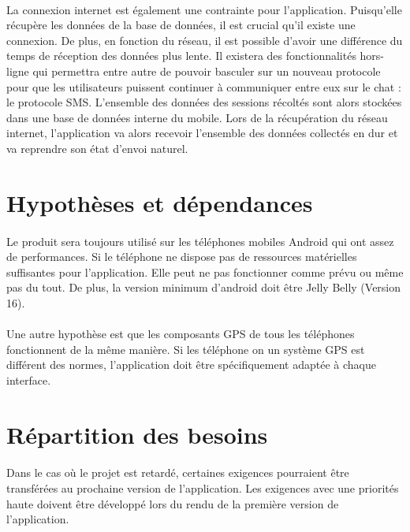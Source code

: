 \documentclass[titlepage, 12pt]{report}
\begin{document}
\paragraph{}La connexion internet est également une contrainte pour l'application. Puisqu'elle récupère les données de la base de données, il est crucial qu'il existe une connexion. De plus, en fonction du réseau, il est possible d'avoir une différence du temps de réception des données plus lente.
Il existera des fonctionnalités hors-ligne qui permettra entre autre de pouvoir basculer sur un nouveau protocole pour que les utilisateurs puissent continuer à communiquer entre eux sur le chat : le protocole SMS. L'ensemble des données des sessions récoltés sont alors stockées dans une base de données interne du mobile. Lors de la récupération du réseau internet, l'application va alors recevoir l'ensemble des données collectés en dur et va reprendre son état d'envoi naturel.

\section{Hypothèses et dépendances}

\paragraph{}Le produit sera toujours utilisé sur les téléphones mobiles Android qui ont assez de performances. Si le téléphone ne dispose pas de ressources matérielles suffisantes pour l'application. Elle peut ne pas fonctionner comme prévu ou même pas du tout.
De plus, la version minimum d'android doit être Jelly Belly (Version 16). 

\paragraph{}Une autre hypothèse est que les composants GPS de tous les téléphones fonctionnent de la même manière. Si les téléphone on un système GPS est différent des normes, l'application doit être spécifiquement adaptée à chaque interface.

\section{Répartition des besoins}

\paragraph{}Dans le cas où le projet est retardé, certaines exigences pourraient être transférées au prochaine version de l'application. Les exigences avec une priorités haute doivent être développé lors du rendu de la première version de l'application.
\end{document}
